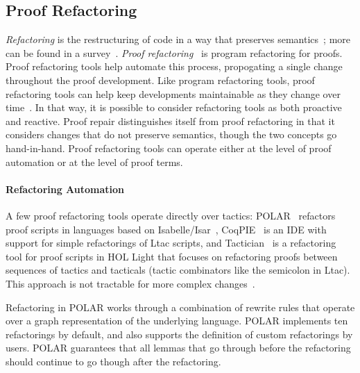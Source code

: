 \subsection*{Proof Refactoring}


\textit{Refactoring} is the restructuring of code in a way that preserves semantics~\cite{opdyke1992refactoring};
more can be found in a survey~\cite{mens2004survey}.
\textit{Proof refactoring}~\cite{WhitesidePhD} is program refactoring for proofs.
Proof refactoring tools help automate this process, propogating a single change throughout the proof development.
Like program refactoring tools, proof refactoring tools can help keep developments
maintainable as they change over time~\cite{Bourke12}. In that way, it is possible to consider refactoring tools 
as both proactive and reactive.
Proof repair distinguishes itself from proof refactoring in that it considers changes that do not
preserve semantics, though the two concepts go hand-in-hand.
Proof refactoring tools can operate either at the level of proof automation or at the level of proof terms.


\paragraph{Refactoring Automation}

A few proof refactoring tools operate directly over tactics:
POLAR~\cite{Dietrich2013} refactors proof scripts in languages based on Isabelle/Isar~\cite{Wenzel2007isar},
CoqPIE~\cite{Roe2016} is an IDE with support for simple refactorings of Ltac scripts, and
Tactician~\cite{adams2015} is a refactoring tool for proof scripts in HOL Light
that focuses on refactoring proofs between sequences of tactics and tacticals (tactic combinators like
the semicolon in Ltac).
This approach is not tractable for more complex changes~\cite{robert2018}.

Refactoring in \textsc{POLAR} works through a combination of rewrite rules that operate over
a graph representation of the underlying language. %
\textsc{POLAR} implements ten refactorings by default,
and also supports the definition of custom refactorings by users. 
\textsc{POLAR} guarantees that all lemmas that go through before
the refactoring should continue to go though after the refactoring.

